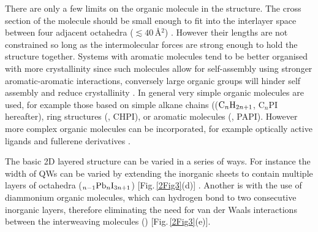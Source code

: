 There are only a few limits on the organic molecule  in the structure. The cross section of the molecule should be small enough to fit into the interlayer space between four adjacent octahedra ($\lesssim 40$\,\AA$^2$) \cite{Mitzi2001a}. However their lengths are not constrained so long as the intermolecular forces are strong enough to hold the structure together. Systems with aromatic molecules tend to be better organised with more crystallinity since such molecules allow for self-assembly using stronger aromatic-aromatic interactions, conversely large organic groups will hinder self assembly and reduce crystallinity \cite{Zhang2009}. In general very simple organic molecules are used, for example those based on simple alkane chains (($\textnormal{C}_n\textnormal{H}_{2n+1}$, C$_n$PI hereafter), ring structures (, CHPI), or aromatic molecules (, PAPI). However more complex organic molecules can be incorporated, for example optically active ligands \cite{Billing2006, Teshima2003} and fullerene derivatives \cite{Kikuchi2005, Kawabata2009}. 

The basic 2D layered structure can be varied in a series of ways. For instance the width of QWs	can be varied by extending the inorganic sheets to contain multiple layers of  octahedra ($_{n-1}\textnormal{Pb}_n\textnormal{I}_{3n+1}$) [Fig.\,\ref{2Fig3}(d)] \cite{Calabrese1991}. Another is with the use of diammonium organic molecules, which can hydrogen bond to two consecutive inorganic layers, therefore eliminating the need for van der Waals interactions between the interweaving molecules () [Fig.\,\ref{2Fig3}(e)].

